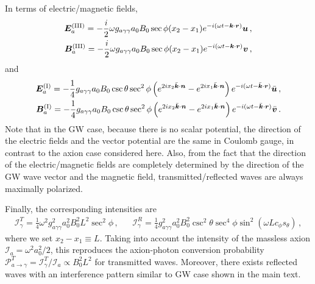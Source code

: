 \documentclass[a4paper,11pt]{article}
\begin{document}
In terms of electric/magnetic fields, %
\begin{equation}
    \begin{aligned}
    \bm{E}_{a}^{\rm (III)} = - \frac{i}{2}  \omega g_{a\gamma\gamma} a_{0} B_{0} \sec \phi (x_{2} - x_{1} )  e^{- i (\omega t - \bm{k} \cdot \bm{r} ) } \bm{u} \,, \\
    \bm{B}_{a}^{\rm (III)} = - \frac{i}{2}  \omega g_{a\gamma\gamma} a_{0} B_{0} \sec \phi (x_{2} - x_{1} )  e^{- i (\omega t - \bm{k} \cdot \bm{r} ) } \bm{v}  \,,
    \end{aligned}
\end{equation}
%
and
%
\begin{equation}
    \begin{aligned}
    \bm{E}_{a}^{\rm (I)} = - \frac{1}{4} g_{a\gamma\gamma} a_{0} B_{0}  \csc\theta \sec^{2} \phi  \left( e^{2 i x_{2}  \bar{\bm{k}} \cdot \bm{n} }  - e^{2 i x_{1} \bar{\bm{k}} \cdot \bm{n} }  \right) e^{- i (\omega t - \bar{\bm{k}} \cdot \bm{r} ) } \bar{\bm{u}} \,, \\
    \bm{B}_{a}^{\rm (I)} = - \frac{1}{4}  g_{a\gamma\gamma} a_{0} B_{0} \csc\theta \sec^{2} \phi  \left( e^{2 i x_{2}  \bar{\bm{k}} \cdot \bm{n} }  - e^{2 i x_{1} \bar{\bm{k}} \cdot \bm{n} }  \right)  e^{- i (\omega t - \bar{\bm{k}} \cdot \bm{r} ) } \bar{\bm{v}}  \,.
    \end{aligned}
\end{equation}
%
Note that in the GW case, because there is no scalar potential, the direction of the electric fields and the vector potential are the same in Coulomb gauge, in contrast to the axion case considered here.
%
Also, from the fact that the direction of the electric/magnetic fields are completely determined by the direction of the GW wave vector and the magnetic field, transmitted/reflected waves are always maximally polarized.

%
Finally, the corresponding intensities are
\begin{align}
    \mathcal{I}_{\gamma}^{T} = \frac{1}{4} \omega^{2} g_{a\gamma\gamma}^{2} a_{0}^{2} B_{0}^{2} L^{2}  \sec^{2} \phi \,,  && \mathcal{I}_{\gamma}^{R} = \frac{1}{4}  g_{a\gamma\gamma}^{2} a_{0}^{2} B_{0}^{2} \csc^{2} \theta \sec^{4} \phi \sin^{2} ( \omega L c_{\phi} s_{\theta} )  \,,
\end{align}
where we set $ x_{2} - x_{1} \equiv L$. Taking into account the intensity of the massless axion $  \mathcal{I}_{a} =  \omega^{2} a_{0}^{2} / 2  $, this reproduces the axion-photon conversion probability $ \mathcal{P}_{a \rightarrow \gamma}^{T} = \mathcal{I}_{\gamma}^{T} / \mathcal{I}_{a}  \propto B_{0}^{2} L^{2} $ for transmitted waves. Moreover, there exists reflected waves with an interference pattern similar to GW case shown in the main text.
\end{document}
